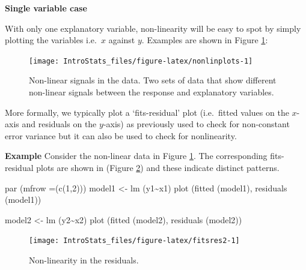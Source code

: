 \documentclass[
  oneside]{krantz}
\newenvironment{Shaded}{\begin{snugshade}}{\end{snugshade}}
\newcommand{\AttributeTok}[1]{\textcolor[rgb]{0.77,0.63,0.00}{#1}}
\newcommand{\DecValTok}[1]{\textcolor[rgb]{0.00,0.00,0.81}{#1}}
\newcommand{\FunctionTok}[1]{\textcolor[rgb]{0.00,0.00,0.00}{#1}}
\newcommand{\NormalTok}[1]{#1}
\newcommand{\OtherTok}[1]{\textcolor[rgb]{0.56,0.35,0.01}{#1}}
\newcommand{\SpecialCharTok}[1]{\textcolor[rgb]{0.00,0.00,0.00}{#1}}
\begin{document}
\textbf{Single variable case}

With only one explanatory variable, non-linearity will be easy to spot by simply plotting the variables i.e.~\(x\) against \(y\). Examples are shown in Figure \ref{fig:nonlinplots}:

\begin{figure}

{\centering \texttt{[image: IntroStats\_files/figure-latex/nonlinplots-1]} 

}

\caption{Non-linear signals in the data. Two sets of data that show different non-linear signals between the response and explanatory variables.}\label{fig:nonlinplots}
\end{figure}

More formally, we typically plot a `fits-residual' plot (i.e.~fitted values on the \(x\)-axis and residuals on the \(y\)-axis) as previously used to check for non-constant error variance but it can also be used to check for nonlinearity.

\textbf{Example} Consider the non-linear data in Figure \ref{fig:nonlinplots}. The corresponding fits-residual plots are shown in (Figure \ref{fig:fitsres2}) and these indicate distinct patterns.

\begin{Shaded}
\begin{Highlighting}[]
\FunctionTok{par}\NormalTok{ (}\AttributeTok{mfrow =}\NormalTok{(}\FunctionTok{c}\NormalTok{(}\DecValTok{1}\NormalTok{,}\DecValTok{2}\NormalTok{)))}
\NormalTok{model1 }\OtherTok{\textless{}{-}} \FunctionTok{lm}\NormalTok{ (y1}\SpecialCharTok{\textasciitilde{}}\NormalTok{x1)}
\FunctionTok{plot}\NormalTok{ (}\FunctionTok{fitted}\NormalTok{ (model1), }\FunctionTok{residuals}\NormalTok{ (model1))}

\NormalTok{model2 }\OtherTok{\textless{}{-}} \FunctionTok{lm}\NormalTok{ (y2}\SpecialCharTok{\textasciitilde{}}\NormalTok{x2)}
\FunctionTok{plot}\NormalTok{ (}\FunctionTok{fitted}\NormalTok{ (model2), }\FunctionTok{residuals}\NormalTok{ (model2))}
\end{Highlighting}
\end{Shaded}

\begin{figure}

{\centering \texttt{[image: IntroStats\_files/figure-latex/fitsres2-1]} 

}

\caption{Non-linearity in the residuals.}\label{fig:fitsres2}
\end{figure}
\end{document}

